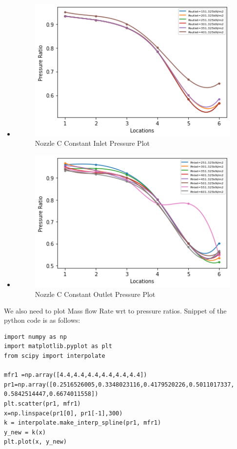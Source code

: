 \begin{itemize}
\newpage
    \item {}
    \begin{figure}[!h]
    \centering
    \includegraphics[width=12cm]{figure 5.png}
    \caption{Nozzle C Constant Inlet Pressure Plot}
\end{figure}


    \item {}
    \begin{figure}[!h]
    \centering
    \includegraphics[width=12cm]{figure 6.png}
    \caption{Nozzle C Constant Outlet Pressure Plot}
\end{figure}
\end{itemize}
\newpage

We also need to plot Mass flow Rate wrt to pressure ratios. Snippet of the python code is as follows:
\begin{framed}
\begin{verbatim}
import numpy as np
import matplotlib.pyplot as plt
from scipy import interpolate

mfr1 =np.array([4.4,4.4,4.4,4.4,4.4,4.4])
pr1=np.array([0.2516526005,0.3348023116,0.4179520226,0.5011017337,
0.5842514447,0.6674011558])
plt.scatter(pr1, mfr1)
x=np.linspace(pr1[0], pr1[-1],300)
k = interpolate.make_interp_spline(pr1, mfr1)
y_new = k(x)
plt.plot(x, y_new)

\end{verbatim}
\end{framed}

